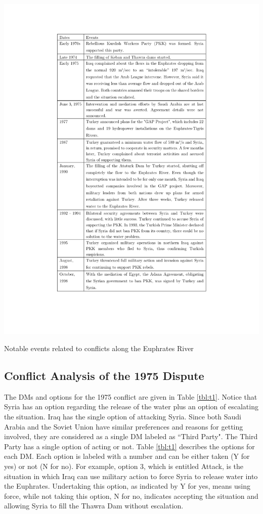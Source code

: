 \documentclass[letterpaper,12pt,titlepage,oneside,final]{book}
\begin{document}
\begin{table}[H]
\centering
\includegraphics[scale=.88]{PDF-IMG/Euphrates_history.pdf}

\caption{Notable events related to conflicts along the Euphrates River}

\label{tbl:historyEuphrates}
\end{table}


\subsection{Conflict Analysis of the 1975 Dispute}
The DMs and options for the 1975 conflict are given in Table \ref{tbl:t1}. Notice that Syria has an option regarding the release of the water plus an option of escalating the situation. Iraq has the single option of attacking Syria. Since both Saudi Arabia and the Soviet Union have similar preferences and reasons for getting involved, they are considered as a single DM labeled as ``Third Party". The Third Party has a single option of acting or not. Table \ref{tbl:t1} describes the options for each DM. Each option is labeled with a number and can be either taken (Y for yes) or not (N for no). For example, option 3, which is entitled Attack, is the situation in which Iraq can use military action to force Syria to release water into the Euphrates. Undertaking this option, as indicated by Y for yes, means using force, while not taking this option, N for no, indicates accepting the situation and allowing Syria to fill the Thawra Dam without escalation.
\end{document}
